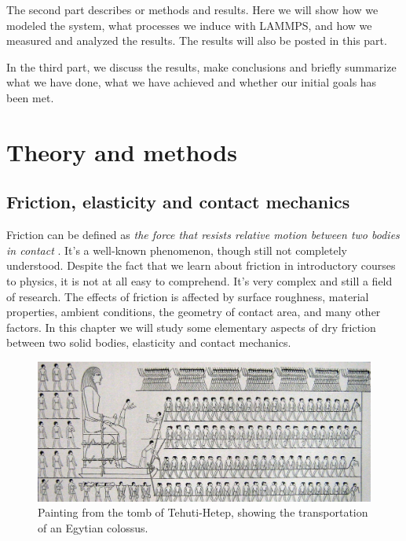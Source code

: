 \documentclass[twoside,english]{uiofysmaster}
\begin{document}
The second part describes or methods and results.
Here we will show how we modeled the system, what processes we induce with LAMMPS, and how we measured and analyzed the results. 
The results will also be posted in this part.

In the third part, we discuss the results, make conclusions and briefly summarize what we have done, what we have achieved and whether our initial goals has been met.
    
	





\part{Theory and methods}


\chapter{Friction, elasticity and contact mechanics}
Friction can be defined as \textit{the force that resists relative motion between two bodies in contact} \cite{frictionDefinition}. 
It's a well-known phenomenon, though still not completely understood.
Despite the fact that we learn about friction in introductory courses to physics, it is not at all easy to comprehend. 
It's very complex and still a field of research.
The effects of friction is affected by surface roughness, material properties, ambient conditions, the geometry of contact area, and many other factors. 
In this chapter we will study some elementary aspects of dry friction between two solid bodies, elasticity and contact mechanics. 


\begin{figure}[H]
	\centering
	\includegraphics[width=0.99\linewidth]{figures/friction/Colossus.jpg}
	\caption{Painting from the tomb of Tehuti-Hetep, showing the transportation of an Egytian colossus.}
	\label{fig:Colossus}
\end{figure}
\end{document}
